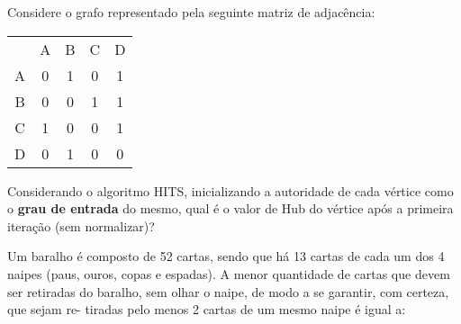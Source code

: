 \documentclass[16pt]{examdesign}
\begin{document}
\begin{multiplechoice}[title={Questões de múltipla escolha (3 pontos cada) },rearrange=no, resetcounter=no,suppressprefix,examcolumns=2,keycolumns=2]
   \begin{question}
   \vspace{-30pt}
      Considere o grafo representado pela seguinte matriz de adjacência: 

      \begin{center}
 


      \begin{tabular}{ccccc}
                       & A                      & B                      & C                      & D                      \\ \cline{2-5} 
\multicolumn{1}{c|}{A} & \multicolumn{1}{c|}{0} & \multicolumn{1}{c|}{1} & \multicolumn{1}{c|}{0} & \multicolumn{1}{c|}{1}\\ \cline{2-5} 
\multicolumn{1}{c|}{B} & \multicolumn{1}{c|}{0} & \multicolumn{1}{c|}{0} & \multicolumn{1}{c|}{1} & \multicolumn{1}{c|}{1}\\ \cline{2-5} 
\multicolumn{1}{c|}{C} & \multicolumn{1}{c|}{1} & \multicolumn{1}{c|}{0} & \multicolumn{1}{c|}{0} & \multicolumn{1}{c|}{1}\\ \cline{2-5} 
\multicolumn{1}{c|}{D} & \multicolumn{1}{c|}{0} & \multicolumn{1}{c|}{1} & \multicolumn{1}{c|}{0} & \multicolumn{1}{c|}{0}\\ \cline{2-5} 
\end{tabular}
\end{center}

Considerando o algoritmo HITS, inicializando a autoridade de cada vértice como o \textbf{grau de entrada} do mesmo, 
qual é o valor de Hub do vértice \textbf{} após a primeira iteração (sem normalizar)?
    \end{question}
      \begin{question}
	 Um baralho é composto de 52
cartas, sendo que há 13 cartas de cada um dos 4 naipes
(paus, ouros, copas e espadas). A menor quantidade de
cartas que devem ser retiradas do baralho, sem olhar o
naipe, de modo a se garantir, com certeza, que sejam re-
tiradas pelo menos 2 cartas de um mesmo naipe é igual
a:


\end{question}
\end{multiplechoice}
\end{document}
